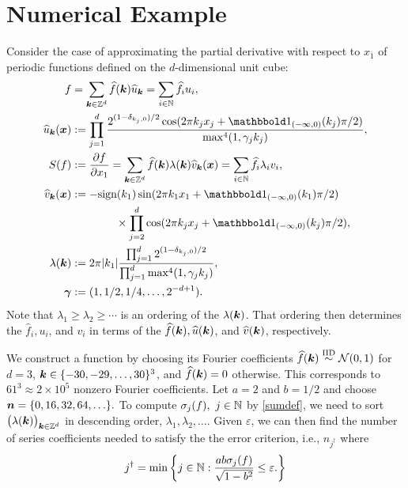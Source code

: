 \documentclass[graybox,footinfo]{svmult}
\newcommand{\DHJRabs}[1]{\ensuremath{{\left \lvert #1 \right \rvert}}}
\begin{document}
\section{Numerical Example} \label{sec:examp}

Consider the case of approximating the  partial derivative with respect to $x_1$ of periodic functions defined on the $d$-dimensional unit cube:
\begin{align*}
\allowdisplaybreaks
f &= \sum_{\bsk \in \bbZ^d} \widehat{f}(\bsk) \widehat{u}_{\bsk} = \sum_{i \in \bbN} \widehat{f}_i u_i , \\
\widehat{u}_{\bsk} (\bsx) &:= \prod_{j=1}^d \frac{2^{(1-\delta_{k_j,0})/2}\cos(2\pi k_j x_j  + \bbone_{(-\infty,0)}(k_j) \pi/2 )}{\max^4(1,\gamma_j k_j)},  \\ 
S(f) &: = \frac{\partial f}{\partial x_1} = \sum_{\bsk \in \bbZ^d} \widehat{f}(\bsk) \lambda(\bsk) \widehat{v}_{\bsk} (\bsx)
= \sum_{i \in \bbN} \widehat{f}_i \lambda_i v_i, \\ 
\widehat{v}_{\bsk}(\bsx) & : =  -\textup{sign}(k_1)  \sin(2\pi k_1 x_1  + \bbone_{(-\infty,0)}(k_1) \pi/2 ) \\
& \qquad \qquad \times \prod_{j=2}^d
\cos(2\pi k_j x_j  + \bbone_{(-\infty,0)}(k_j) \pi/2 ), \\ 
\lambda(\bsk) &:= 2 \pi \DHJRabs{k_1}\frac{\prod_{j=1}^d 2^{(1-\delta_{k_j,0})/2}}{\prod_{j=1}^d\max^4(1,\gamma_j k_j)}, \\
\boldsymbol{\gamma} & := (1,1/2, 1/4, \ldots, 2^{-d+1}).
\end{align*}
Note that $\lambda_1 \ge \lambda_2 \ge \cdots$ is an ordering of the $\lambda({\boldsymbol{k}})$.  That ordering then determines the $\widehat{f}_i, u_i$, and $v_i$ in terms of the $\widehat{f}({\boldsymbol{k}}), \widehat{u}({\boldsymbol{k}})$, and $\widehat{v}({\boldsymbol{k}})$, respectively.

We construct a function by choosing its Fourier coefficients $\widehat{f}({\boldsymbol{k}}) \overset{\text{IID}}{\sim}  \mathcal{N}(0,1)$ for $d=3$, ${\boldsymbol{k}} \in \{-30, -29, \ldots, 30\}^3$, and $\widehat{f}({\boldsymbol{k}}) = 0$ otherwise.  This corresponds to $61^3 \approx 2 \times 10^5$ nonzero Fourier coefficients.  Let $ a= 2$ and  $b=1/2$ and 
 choose ${\boldsymbol{n}} = \{0, 16, 32, 64, \ldots \}.$
 To  compute $\sigma_j(f), \ j \in {\mathbb{N}}$ by \eqref{sumdef},
 we need to sort $\bigl(\lambda({\boldsymbol{k}})\bigr)_{{\boldsymbol{k}} \in {\mathbb{Z}}^d}$ in descending order, $\lambda_1, \lambda_2, \ldots$. Given $\varepsilon$, we can then find the number of series coefficients needed to satisfy the the error criterion, i.e., $n_{j^\dagger}$ where
 \[j^{\dagger} = \min \left\{j \in {\mathbb{N}} : \frac{ab\sigma_j(f)}{\sqrt{1-b^2}}  \le \varepsilon. \right\}\]
 
\end{document}
